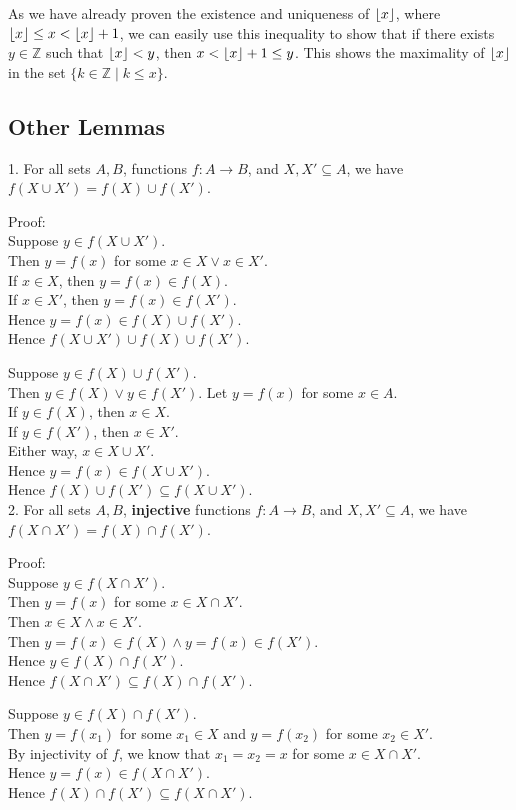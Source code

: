 \documentclass{article}
\DeclarePairedDelimiter\floor{\lfloor}{\rfloor}
\begin{document}
As we have already proven the existence and uniqueness of $\floor{x}$, where $\floor{x}\leq x<\floor{x}+1$, we can easily use this inequality to show that if there exists $y\in \mathbb{Z}$ such that $\floor{x}<y$, then $x<\floor{x}+1\leq y$. This shows the maximality of $\floor{x}$ in the set $\{k\in \mathbb{Z}\mid k\leq x\}$.

\subsection{Other Lemmas}

1. For all sets $A,B$, functions $f: A\rightarrow B$, and $X,X'\subseteq A$, we have $f(X\cup X')=f(X)\cup f(X')$.

Proof:\\
Suppose $y\in f(X\cup X')$. \\Then $y=f(x)$ for some $x\in X\lor x\in X'$. \\
If $x\in X$, then $y=f(x)\in f(X)$. \\If $x\in X'$, then $y=f(x)\in f(X')$. \\ Hence $y=f(x)\in f(X)\cup f(X').$\\
Hence $f(X\cup X')\cup f(X)\cup f(X')$.

Suppose $y\in f(X)\cup f(X')$. \\Then $y\in f(X)\lor y\in f(X')$. Let $y=f(x)$ for some $x\in A$.\\
If $y\in f(X)$, then $x\in X$.\\
If $y\in f(X')$, then $x\in X'$. \\Either way, $x\in X\cup X'$. \\Hence $y=f(x)\in f(X\cup X')$. \\Hence $f(X)\cup f(X')\subseteq f(X\cup X')$.\\


2. For all sets $A,B$, \textbf{injective} functions $f: A\rightarrow B$, and $X,X'\subseteq A$, we have $f(X\cap X')=f(X)\cap f(X')$.

Proof: \\
Suppose $y\in f(X\cap X')$. \\Then $y=f(x)$ for some $x\in X\cap X'$. \\Then $x\in X\land x\in X'$.\\
Then $y=f(x)\in f(X)\land y=f(x)\in f(X')$.\\
Hence $y\in f(X)\cap f(X')$.\\
Hence $f(X\cap X')\subseteq f(X)\cap f(X')$.

Suppose $y\in f(X)\cap f(X')$. \\Then $y=f(x_1)$ for some $x_1\in X$ and $y=f(x_2)$ for some $x_2\in X'$.\\ By injectivity of $f$, we know that $x_1=x_2=x$ for some $x\in X\cap X'$.\\
Hence $y=f(x)\in f(X\cap X')$.\\
Hence $f(X)\cap f(X')\subseteq f(X\cap X')$.
\end{document}
